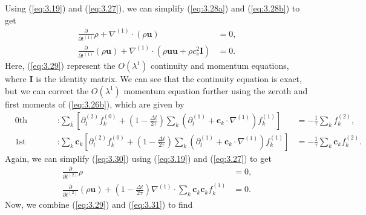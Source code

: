 \documentclass[a4paper, 11pt]{report}
\begin{document}
Using (\ref{eq:3.19}) and (\ref{eq:3.27}), we can simplify (\ref{eq:3.28a}) and (\ref{eq:3.28b}) to get
\begin{subequations} \label{eq:3.29}
\begin{align}
\frac{\partial}{\partial t^{(1)}}\rho + \nabla^{(1)}\cdot(\rho\mathbf{u}) &= 0, \label{eq:3.29a}\\
\frac{\partial}{\partial t^{(1)}}(\rho\mathbf{u}) + \nabla^{(1)}\cdot\left( \rho\mathbf{u}\mathbf{u} + \rho c_s^2 \mathbf{I}\right) &= 0. \label{eq:3.29b}
\end{align}
\end{subequations}
Here, (\ref{eq:3.29}) represent the $O(\lambda^1)$ continuity and momentum equations, where $\mathbf{I}$ is the identity matrix. We can see that the continuity equation is exact, but we can correct the $O(\lambda^1)$ momentum equation further using the zeroth and first moments of (\ref{eq:3.26b}), which are given by
\begin{subequations} \label{eq:3.30}
\begin{align}
&0\text{th moment}: & \sum_k\left[\partial_t^{(2)}f_k^{(0)} + \left(1-\frac{\Delta t}{2\tau}\right)\sum_k\left(\partial_t^{(1)} + \mathbf{c}_k\cdot\nabla^{(1)}\right)f_k^{(1)}\right] &= {-\frac{1}{\tau}\sum_kf_k^{(2)}},& \label{eq:3.30a} \\
&1\text{st moment}: &\sum_k\mathbf{c}_k\left[\partial_t^{(2)}f_k^{(0)} + \left(1-\frac{\Delta t}{2\tau}\right)\sum_k\left(\partial_t^{(1)} + \mathbf{c}_k\cdot\nabla^{(1)}\right)f_k^{(1)}\right] &= -\frac{1}{\tau}\sum_k\mathbf{c}_kf_k^{(2)}.& \label{eq:3.30b}
\end{align}
\end{subequations}
Again, we can simplify (\ref{eq:3.30}) using (\ref{eq:3.19}) and (\ref{eq:3.27}) to get
\begin{subequations} \label{eq:3.31}
\begin{align}
\frac{\partial}{\partial t^{(2)}}\rho &= 0, \label{eq:3.31a}\\
\frac{\partial}{\partial t^{(2)}}(\rho\mathbf{u}) + \left(1-\frac{\Delta t}{2\tau}\right)\nabla^{(1)}\cdot\sum_k\mathbf{c}_k\mathbf{c}_kf_k^{(1)} &= 0.\label{eq:3.31b}
\end{align}
\end{subequations}
Now, we combine (\ref{eq:3.29}) and (\ref{eq:3.31}) to find
\end{document}
